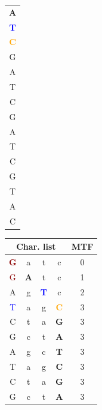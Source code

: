\documentclass[hyperref={pagebackref=true},table]{beamer}
\newcommand{\mc}[3] {\multicolumn {#1}{#2}{#3}}
\begin{document}
\begin{frame}
\begin{table}[!ht]
\begin{center}
\begin{tabular}{ c }
        \textcolor{green!90!black}  {\textbf{A}} \\
        \textcolor{blue}   {\textbf{T}}          \\
        \textcolor{orange} {\textbf{C}}          \\
        G                                        \\
        A                                        \\
        T                                        \\
        C                                        \\
        G                                        \\
        A                                        \\
        T                                        \\
        C                                        \\
        G                                        \\
        T                                        \\
        A                                        \\
        C                                        \\ \hline
      \end{tabular}
    {\Large\pointer}
      \begin{tabular}{ c c c c c }
        \hline
        \mc{4}{c}{\textbf{Char. list}} & \textbf{MTF} \\ \hline
        \textcolor{darkred}{\textbf{G}} & a & t & c & 0 \\
        \textcolor{darkred}{G} & \textcolor{green!90!black}{\textbf{A}} & t & c & 1 \\
        \textcolor{green!90!black}{A} & g & \textcolor{blue}{\textbf{T}} & c & 2 \\
        \textcolor{blue}{T} & a & g & \textcolor{orange}{\textbf{C}} & 3 \\
        C & t & a & \textbf{G} & 3 \\
        G & c & t & \textbf{A} & 3 \\
        A & g & c & \textbf{T} & 3 \\
        T & a & g & \textbf{C} & 3 \\
        C & t & a & \textbf{G} & 3 \\
        G & c & t & \textbf{A} & 3 \\

\end{tabular}
\end{center}
\end{table}
\end{frame}
\end{document}
